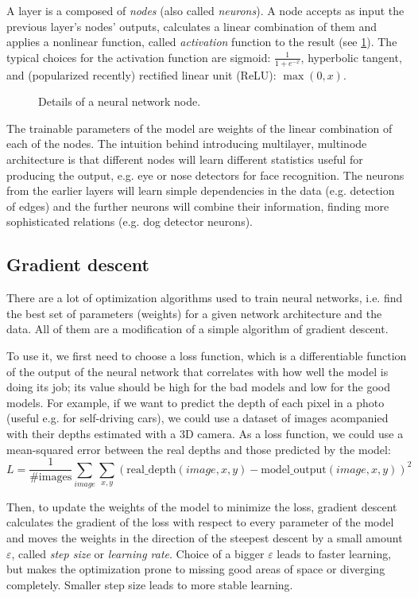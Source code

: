A layer is a composed of \emph{nodes} (also called \emph{neurons}). A node accepts as input the previous layer's nodes' outputs, calculates a linear combination of them and applies a nonlinear function, called \emph{activation} function to the result (see \ref{ann-nodes}). The typical choices for the activation function are sigmoid: $\frac{1}{1 + e^{-x}}$, hyperbolic tangent, and (popularized recently) rectified linear unit (ReLU): $\max(0, x)$. 
\begin{figure}[h]
  \centering
  \resizebox{0.7\textwidth}{!}{
  
}
  \caption{Details of a neural network node.} \label{ann-nodes}
\end{figure}

The trainable parameters of the model are weights of the linear combination of each of the nodes. The intuition behind introducing multilayer, multinode architecture is that different nodes will learn different statistics useful for producing the output, e.g. eye or nose detectors for face recognition. The neurons from the earlier layers will learn simple dependencies in the data (e.g. detection of edges) and the further neurons will combine their information, finding more sophisticated relations (e.g. dog detector neurons).

\subsection{Gradient descent}
There are a lot of optimization algorithms used to train neural networks, i.e. find the best set of parameters (weights) for a given network architecture and the data. All of them are a modification of a simple algorithm of gradient descent.

To use it, we first need to choose a loss function, which is a differentiable function of the output of the neural network that correlates with how well the model is doing its job; its value should be high for the bad models and low for the good  models. For example, if we want to predict the depth of each pixel in a photo (useful e.g. for self-driving cars), we could use a dataset of images acompanied with their depths estimated with a 3D camera. As a loss function, we could use a mean-squared error between the real depths and those predicted by the model:
$$
L = \frac{1}{\mbox{\# images}}\sum_{image} \sum_{x, y} (\mbox{real\_depth}(image, x, y) - \mbox{model\_output}(image, x, y))^2
$$

Then, to update the weights of the model to minimize the loss, gradient descent calculates the gradient of the loss with respect to every parameter of the model and moves the weights in the direction of the steepest descent by a small amount $\varepsilon$, called \emph{step size} or \emph{learning rate}. Choice of a bigger $\varepsilon$ leads to faster learning, but makes the optimization prone to missing good areas of space or diverging completely. Smaller step size leads to more stable
learning.

